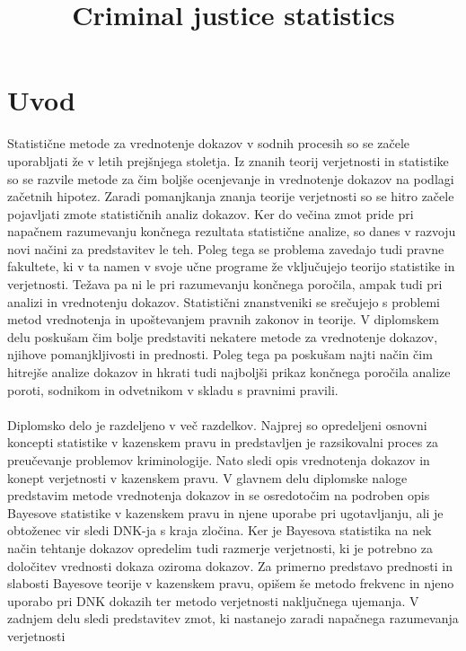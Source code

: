 \documentclass[fin1, tisk]{fmfdelo}
\title{Criminal justice statistics}
\theoremstyle{definition}
\theoremstyle{trditev}
\theoremstyle{izrek}
\begin{document}
\nocite{collins,byers,aitkena,hoff,aitkenb,aitkenc,aitkend,bello,berger,conklin,dahlman,fentona,fentonb,finkelstein,gastwirth,giannini,glover,iliinski,maarcot,macedo,maddan,matthews,orban,schumana,schumanb,scurich,balaba,blankenship,skorupski,balding,bidermann,tarling}

\section{Uvod}
Statistične metode za vrednotenje dokazov v sodnih procesih so se začele uporabljati že v letih prejšnjega stoletja. Iz znanih teorij verjetnosti in
statistike so se razvile metode za čim boljše ocenjevanje in vrednotenje dokazov na podlagi začetnih hipotez. Zaradi pomanjkanja znanja teorije
verjetnosti so se hitro začele pojavljati zmote statističnih analiz dokazov. Ker do večina zmot pride pri napačnem razumevanju končnega rezultata
statistične analize, so danes v razvoju novi načini za predstavitev le teh. Poleg tega se problema zavedajo tudi pravne fakultete, ki v ta namen v svoje učne
programe že vključujejo teorijo statistike in verjetnosti. Težava pa ni le pri razumevanju končnega poročila, ampak tudi pri analizi in vrednotenju
dokazov. Statistični znanstveniki se srečujejo s problemi metod vrednotenja in upoštevanjem pravnih zakonov in teorije. V diplomskem delu poskušam
čim bolje predstaviti nekatere metode za vrednotenje dokazov, njihove pomanjkljivosti in prednosti. Poleg tega pa poskušam najti način čim hitrejše
analize dokazov in hkrati tudi najboljši prikaz končnega poročila analize poroti, sodnikom in odvetnikom v skladu s pravnimi pravili.\\\\
Diplomsko delo je razdeljeno v več razdelkov. Najprej so opredeljeni osnovni koncepti statistike v kazenskem pravu in predstavljen je 
razsikovalni proces za preučevanje problemov kriminologije. Nato sledi opis vrednotenja dokazov in konept verjetnosti v kazenskem 
pravu. V glavnem delu diplomske naloge predstavim metode vrednotenja dokazov in se osredotočim na podroben opis Bayesove statistike 
v kazenskem pravu in njene uporabe pri ugotavljanju, ali je obtoženec vir sledi DNK-ja s kraja zločina. Ker je Bayesova statistika 
na nek način tehtanje dokazov opredelim tudi razmerje verjetnosti, ki je potrebno za določitev vrednosti dokaza oziroma dokazov. Za 
primerno predstavo prednosti in slabosti Bayesove teorije v kazenskem pravu, opišem še metodo frekvenc in njeno uporabo pri DNK dokazih 
ter metodo verjetnosti naključnega ujemanja. V zadnjem delu sledi predstavitev zmot, ki nastanejo zaradi napačnega razumevanja verjetnosti 
\end{document}
